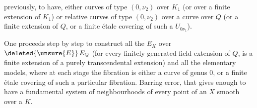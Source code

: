previously, to have, either curves of type $(0,\nu_2)$ over $K_1$\unsure{,} (or over a finite extension of $K_1$) or relative curves of type $(0,\nu_2)$ over a curve over $Q$  (or a finite extension of $Q$, or a finite  étale covering of such a $U_{0\nu_1}$).

One proceeds step by step to  construct all the $E_K$ over $\deleted{\unsure{E}}\,E_Q$ (for every finitely generated field extension of $Q$, is a finite extension of a purely transcendental extension) and all the elementary models, where at each stage the fibration is either a curve of genus $0$, or a finite étale covering of such a particular fibration. Barring error, that gives enough to have a fundamental system of neighbourhoods of every point of an $X$ smooth over a $K$.
